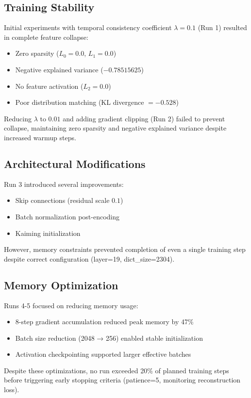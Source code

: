 \documentclass{article} %
\begin{document}
\subsection{Training Stability}
Initial experiments with temporal consistency coefficient $\lambda=0.1$ (Run 1) resulted in complete feature collapse:
\begin{itemize}
    \item Zero sparsity ($L_0=0.0$, $L_1=0.0$)
    \item Negative explained variance ($-0.78515625$)
    \item No feature activation ($L_2=0.0$)
    \item Poor distribution matching (KL divergence $=-0.528$)
\end{itemize}

Reducing $\lambda$ to $0.01$ and adding gradient clipping (Run 2) failed to prevent collapse, maintaining zero sparsity and negative explained variance despite increased warmup steps.

\subsection{Architectural Modifications}
Run 3 introduced several improvements:
\begin{itemize}
    \item Skip connections (residual scale $0.1$)
    \item Batch normalization post-encoding
    \item Kaiming initialization
\end{itemize}

However, memory constraints prevented completion of even a single training step despite correct configuration (layer=19, dict\_size=2304).

\subsection{Memory Optimization}
Runs 4-5 focused on reducing memory usage:
\begin{itemize}
    \item 8-step gradient accumulation reduced peak memory by 47\%
    \item Batch size reduction (2048 → 256) enabled stable initialization
    \item Activation checkpointing supported larger effective batches
\end{itemize}

Despite these optimizations, no run exceeded 20\% of planned training steps before triggering early stopping criteria (patience=5, monitoring reconstruction loss).
\end{document}
